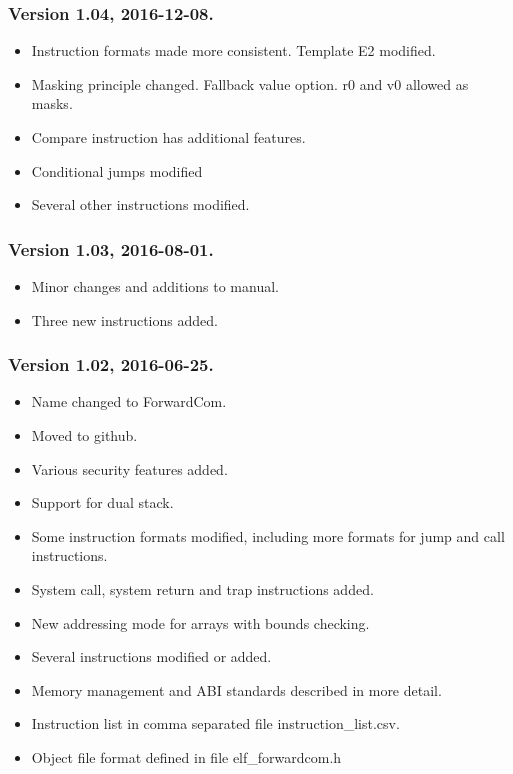 \documentclass[forwardcom.tex]{subfiles}
\begin{document}
\subsubsection{Version 1.04, 2016-12-08.}
\begin{itemize}
\item Instruction formats made more consistent. Template E2 modified.
\item Masking principle changed. Fallback value option. r0 and v0 allowed as masks.
\item Compare instruction has additional features.
\item Conditional jumps modified
\item Several other instructions modified.
\end{itemize}


\subsubsection{Version 1.03, 2016-08-01.}
\begin{itemize}
\item Minor changes and additions to manual.
\item Three new instructions added.
\end{itemize}

\subsubsection{Version 1.02, 2016-06-25.}
\begin{itemize}
\item Name changed to ForwardCom.
\item Moved to github.
\item Various security features added.
\item Support for dual stack.
\item Some instruction formats modified, including more formats for jump and call instructions.
\item System call, system return and trap instructions added.
\item New addressing mode for arrays with bounds checking.
\item Several instructions modified or added.
\item Memory management and ABI standards described in more detail.
\item Instruction list in comma separated file instruction\_list.csv.
\item Object file format defined in file elf\_forwardcom.h
\end{itemize}
\end{document}
